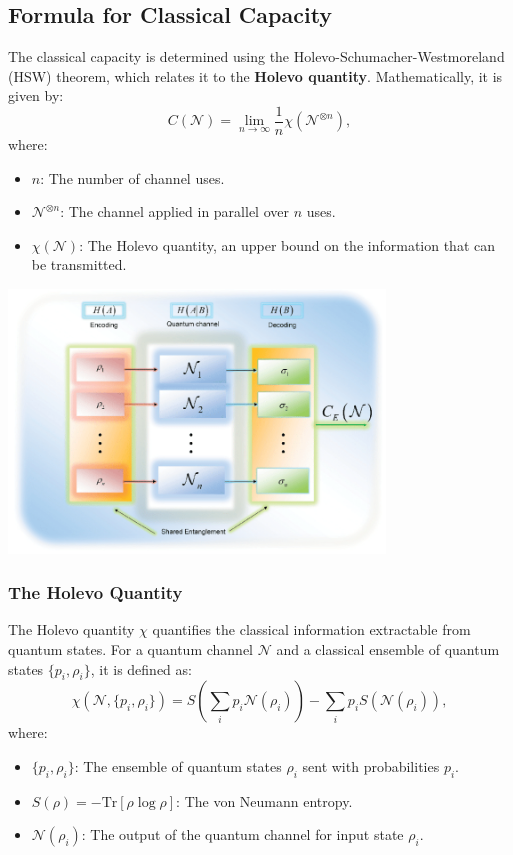 \subsection{Formula for Classical Capacity}
The classical capacity is determined using the Holevo-Schumacher-Westmoreland (HSW) theorem, which relates it to the \textbf{Holevo quantity}. Mathematically, it is given by:
\[
C(\mathcal{N}) = \lim_{n \to \infty} \frac{1}{n} \chi\left(\mathcal{N}^{\otimes n}\right),
\]
where:
\begin{itemize}
    \item \(n\): The number of channel uses.
    \item \(\mathcal{N}^{\otimes n}\): The channel applied in parallel over \(n\) uses.
    \item \(\chi(\mathcal{N})\): The Holevo quantity, an upper bound on the information that can be transmitted.
\end{itemize}

\begin{center}
    \includegraphics[width=0.75\textwidth]{figures/classical_cap.png}
\end{center}

\subsubsection{The Holevo Quantity}
The Holevo quantity \(\chi\) quantifies the classical information extractable from quantum states. For a quantum channel \(\mathcal{N}\) and a classical ensemble of quantum states \(\{p_i, \rho_i\}\), it is defined as:
\[
\chi(\mathcal{N}, \{p_i, \rho_i\}) = S\left( \sum_i p_i \mathcal{N}(\rho_i) \right) - \sum_i p_i S\left( \mathcal{N}(\rho_i) \right),
\]
where:
\begin{itemize}
    \item \(\{p_i, \rho_i\}\): The ensemble of quantum states \(\rho_i\) sent with probabilities \(p_i\).
    \item \(S(\rho) = -\text{Tr}[\rho \log \rho]\): The von Neumann entropy.
    \item \(\mathcal{N}(\rho_i)\): The output of the quantum channel for input state \(\rho_i\).
\end{itemize}

